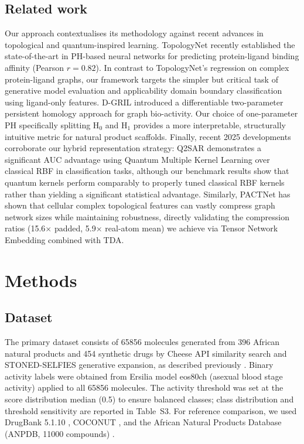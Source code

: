 \documentclass[11pt,a4paper]{article}
\begin{document}
\subsection{Related work}

Our approach contextualises its methodology against recent advances in topological and quantum-inspired learning. TopologyNet \citep{topologynet_2025} recently established the state-of-the-art in PH-based neural networks for predicting protein-ligand binding affinity (Pearson $r = 0.82$). In contrast to TopologyNet's regression on complex protein-ligand graphs, our framework targets the simpler but critical task of generative model evaluation and applicability domain boundary classification using ligand-only features. D-GRIL \citep{dgril_2026} introduced a differentiable two-parameter persistent homology approach for graph bio-activity. Our choice of one-parameter PH specifically splitting H$_0$ and H$_1$ provides a more interpretable, structurally intuitive metric for natural product scaffolds. Finally, recent 2025 developments corroborate our hybrid representation strategy: Q2SAR \citep{q2sar_2025} demonstrates a significant AUC advantage using Quantum Multiple Kernel Learning over classical RBF in classification tasks, although our benchmark results show that quantum kernels perform comparably to properly tuned classical RBF kernels rather than yielding a significant statistical advantage. Similarly, PACTNet \citep{pactnet_2025} has shown that cellular complex topological features can vastly compress graph network sizes while maintaining robustness, directly validating the compression ratios (\num{15.6}$\times$ padded, \num{5.9}$\times$ real-atom mean) we achieve via Tensor Network Embedding combined with TDA.


\section{Methods}

\subsection{Dataset}

The primary dataset consists of \num{65856} molecules generated from 396 African natural products and 454 synthetic drugs by Cheese API similarity search and STONED-SELFIES generative expansion, as described previously \citep{temgoua2026antimalarial}. Binary activity labels were obtained from Ersilia model eos80ch (asexual blood stage activity) applied to all \num{65856} molecules. The activity threshold was set at the score distribution median (0.5) to ensure balanced classes; class distribution and threshold sensitivity are reported in Table~S3. For reference comparison, we used DrugBank 5.1.10 \citep{drugbank_2018}, COCONUT \citep{coconut_2021}, and the African Natural Products Database (ANPDB, \num{11000} compounds) \citep{anpdb_2026}.
\end{document}
